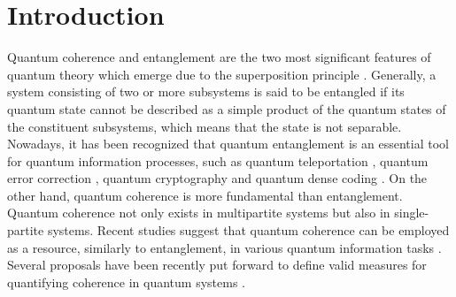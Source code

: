 \documentclass[twocolumn,3p,times]{elsarticle}
\begin{document}

\section{Introduction}
Quantum coherence and entanglement are the two most significant features of quantum theory which emerge due to the superposition principle \cite{RevModPhys.89.041003,horodecki2009quantum,LFCSciRep,lofrancoreview,Orszag:10}. Generally, a system consisting of two or more subsystems is said to be entangled if its quantum state cannot be described as a simple product of the quantum states of the constituent subsystems, which means that the state is not separable. Nowadays, it has been recognized that quantum entanglement is an essential tool for quantum information processes, such as quantum teleportation \cite{PRL701895}, quantum error correction \cite{PRL77198,PRA5567}, quantum cryptography \cite{PRL67661} and quantum dense coding \cite{PRL692881}. 
On the other hand, quantum coherence is more fundamental than entanglement. Quantum coherence not only exists in multipartite systems but also in single-partite systems. Recent studies suggest that quantum coherence can be employed as a resource, similarly to entanglement, in various quantum information tasks \cite{RevModPhys.89.041003,arXiv0612146,PRL113140401,PRL116120404,PRL117020402,PhysRevLett.117.160402}. Several proposals have been recently put forward to define valid measures for quantifying coherence in quantum systems \cite{RevModPhys.89.041003,arXiv0612146,PRA94052336,PRL116150502,PRA93012110,PRA94060302}.
\end{document}
